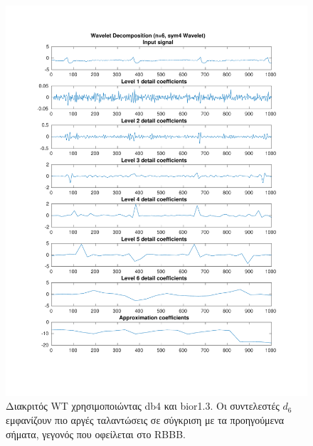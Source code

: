 \documentclass[11pt,a4paper]{article}
\begin{document}
\begin{figure}[H]
\begin{minipage}{0.48\textwidth}
	\includegraphics[width=\textwidth]{fig/118l1_dwt2.pdf}
\end{minipage}
\vfill
\caption{Διακριτός WT χρησιμοποιώντας db4 και bior1.3. Οι συντελεστές $d_6$ εμφανίζουν πιο αργές ταλαντώσεις σε σύγκριση με τα προηγούμενα σήματα, γεγονός που οφείλεται στο RBBB.}
\label{fig:118l1_dwt}
\end{figure}
\end{document}
